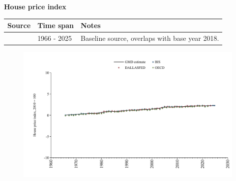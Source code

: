 \documentclass[12pt,a4paper,landscape]{article}
\begin{document}
\begin{adjustbox}{max totalsize={\paperwidth}{\paperheight},center}
\begin{minipage}[t][\textheight][t]{\textwidth}
\vspace*{0.5cm}
{}
\begin{center}
{\Large\bfseries House price index}
\end{center}
\vspace{0.5cm}
\begin{table}[H]
\centering
\small
\begin{tabular}{|l|l|l|}
\hline
\textbf{Source} & \textbf{Time span} & \textbf{Notes} \\
\hline
\rowcolor{white}\cite{BIS}& 1966 - 2025 &Baseline source, overlaps with base year 2018. \\
\hline
\end{tabular}
\end{table}
\begin{figure}[H]
\centering
\includegraphics[width=\textwidth,height=0.6\textheight,keepaspectratio]{graphs/ZAF_HPI.pdf}
\end{figure}
\end{minipage}
\end{adjustbox}
\end{document}
